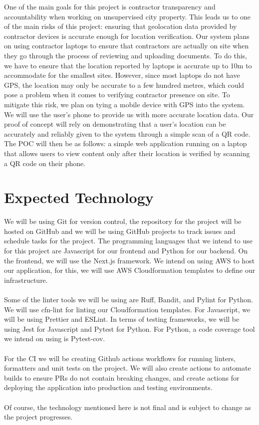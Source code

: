 \documentclass{article}
\begin{document}
One of the main goals for this project is contractor transparency and
accountability when working on
unsupervised city property. This leads us to one of the main risks of
this project: ensuring that geolocation
data provided by contractor devices is accurate enough for location
verification. Our system plans on using
contractor laptops to ensure that contractors are actually on site
when they go through the process of
reviewing and uploading documents. To do this, we have to ensure that
the location reported by laptops is
accurate up to 10m to accommodate for the smallest sites. However,
since most laptops do not have GPS, the
location may only be accurate to a few hundred metres, which could
pose a problem when it comes to
verifying contractor presence on site. To mitigate this risk, we plan
on tying a mobile device with GPS into the
system. We will use the user’s phone to provide us with more accurate
location data. Our proof of concept will
rely on demonstrating that a user’s location can be accurately and
reliably given to the system through a
simple scan of a QR code. The POC will then be as follows: a simple
web application running on a laptop that
allows users to view content only after their location is verified by
scanning a QR code on their phone.

\section{Expected Technology}

We will be using Git for version control, the repository for the
project will be hosted on GitHub and we will be
using GitHub projects to track issues and schedule tasks for the
project. The programming languages that we
intend to use for this project are Javascript for our frontend and
Python for our backend. On the frontend, we
will use the Next.js framework. We intend on using AWS to host our
application, for this, we will use AWS
Cloudformation templates to define our infrastructure.\\
\\
Some of the linter tools we will be using are Ruff, Bandit, and
Pylint for Python. We will use cfn-lint for linting
our Cloudformation templates. For Javascript, we will be using
Prettier and ESLint. In terms of testing
frameworks, we will be using Jest for Javascript and Pytest for
Python. For Python, a code coverage tool we
intend on using is Pytest-cov.\\
\\
For the CI we will be creating Github actions workflows for running
linters, formatters and unit tests on the
project. We will also create actions to automate builds to ensure PRs
do not contain breaking changes, and
create actions for deploying the application into production and
testing environments.\\
\\
Of course, the technology mentioned here is not final and is subject
to change as the project progresses.
\end{document}
